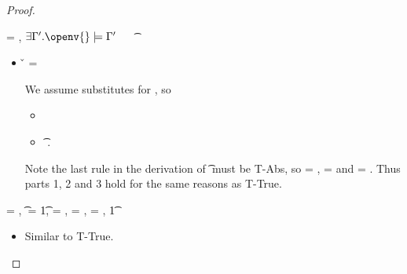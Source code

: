 \begin{lemma}
\begin{enumerate}
\begin{proof}
\begin{case}[T-Clos] \e{} = {\closure {\openv{}} {\abs {\x{}} {\sp{}} {}}},
  $\exists {\propenvp{}}. \satisfies{\openv{}}{\propenvp{}}$
  \ \ 
\judgement {\propenvp{}} { {\t{}}}
                 {\filterset {\thenprop {\prop{}}}
                             {\elseprop {\prop{}}}}
                 {\object{}}
  \begin{itemize}
    \item[]
      \begin{subcase}[B-Abs] \v{} = {\closure {\openv{}} {\abs {\x{}} {\sp{}} {}}}

        We assume \propenv{} substitutes for \propenvp{}, so 
        \begin{itemize}
          \item \satisfies{\openv{}}{\propenv{}}
          \item \judgement {\propenv{}} { {\t{}}}
                           {\filterset {\thenprop {\prop{}}}
                                       {\elseprop {\prop{}}}}
                           {\object{}}.
       \end{itemize}
       Note the last rule in the derivation of
          \judgement {\propenv{}} { {\t{}}}
                           {\filterset {\thenprop {\prop{}}}
                                       {\elseprop {\prop{}}}}
                           {\object{}}
                           must be T-Abs, so 
                           {\thenprop {\prop{}}} = {\topprop{}},
                           {\elseprop {\prop{}}} = {\botprop{}}
                           and {\object{}} = {\emptyobject{}}.
         Thus parts 1, 2 and 3 hold for the same reasons as T-True.

      \end{subcase} 
  \end{itemize}
\end{case}

\begin{case}[T-Multi] \e{} = { {\disptable{}}},
  \t{} = {\MultiFntype {\s{}} {\t{1}}},
  {\thenprop {\prop{}}} = {\topprop{}},
  {\elseprop{\prop{}}} = {\botprop{}},
  {\object{}} = {\emptyobject{}},
  \judgementtwo {} { {\t{1}}} 

  \begin{itemize}
    \item[]
      \begin{subcase}[B-Val]
        Similar to T-True.
      \end{subcase}
  \end{itemize}


\end{case}
\end{proof}
\end{enumerate}
\end{lemma}
